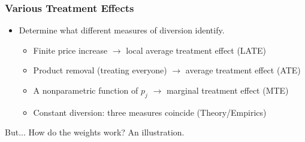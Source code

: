 \documentclass[xcolor=pdftex,dvipsnames,table,mathserif,aspectratio=169]{beamer}
\begin{document}
\begin{frame}
\frametitle{Various Treatment Effects}
\begin{itemize}
\item Determine what different measures of diversion identify.
\begin{itemize}
\item Finite price increase $\rightarrow$ local average treatment effect (LATE)
\item Product removal (treating everyone) $\rightarrow$ average treatment effect (ATE)
\item A nonparametric function of $p_j$ $\rightarrow$ marginal treatment effect (MTE) 
\item Constant diversion: three measures coincide (Theory/Empirics)
\end{itemize}
\end{itemize}
 But... How do the weights work? An illustration.
 \end{frame}





\end{document}
